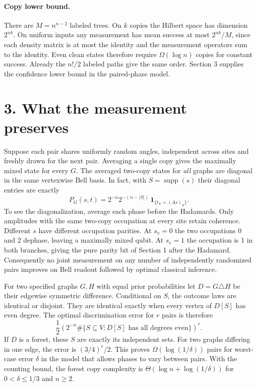 \documentclass[11pt]{article}
\newcommand{\supp}{\operatorname{supp}}
\begin{document}
\paragraph{Copy lower bound.}
There are $M=n^{n-2}$ labeled trees. On $k$ copies the Hilbert space has
dimension $2^{nk}$. On uniform inputs any measurement has mean success
at most $2^{nk}/M$, since each density matrix is at most the identity and
the measurement operators sum to the identity. Even clean states therefore
require $\Omega(\log n)$ copies for constant success. Already the $n!/2$
labeled paths give the same order. Section 3 supplies the confidence
lower bound in the paired-phase model.

\newpage
\section*{3. What the measurement preserves}
Suppose each pair shares uniformly random angles, independent across sites
and freshly drawn for the next pair. Averaging a single copy gives the
maximally mixed state for every $G$. The averaged two-copy states for
\emph{all} graphs are diagonal in the same vertexwise Bell basis.
In fact, with $S=\supp(s)$ their diagonal entries are exactly
\[
 P_G(s,t)=2^{-n}2^{-(n-|S|)}\,\mathbf1_{\{t_S=(As)_S\}} .
\]
To see the diagonalization, average each phase before the Hadamards.
Only amplitudes with the same two-copy occupation at every site retain
coherence. Different $s$ have different occupation parities. At $s_v=0$
the two occupations 0 and 2 dephase, leaving a maximally mixed qubit.
At $s_v=1$ the occupation is 1 in both branches, giving the pure parity
bit of Section 1 after the Hadamard. Consequently no joint measurement
on any number of independently randomized pairs improves on Bell readout
followed by optimal classical inference.

For two specified graphs $G,H$ with equal prior probabilities let
$D=G\triangle H$ be their edgewise symmetric difference. Conditional
on $S$, the outcome laws are identical or disjoint. They are identical
exactly when every vertex of $D[S]$ has even degree. The optimal
discrimination error for $r$ pairs is therefore
\[
 \frac12\left(2^{-n}\#\{S\subseteq V: D[S]\text{ has all degrees even}\}\right)^r.
\]
If $D$ is a forest, these $S$ are exactly its independent sets. For two
graphs differing in one edge, the error is $(3/4)^r/2$. This proves
$\Omega(\log(1/\delta))$ pairs for worst-case error $\delta$ in the model
that allows phases to vary between pairs. With the counting bound, the
forest copy complexity is $\Theta(\log n+\log(1/\delta))$ for
$0<\delta\le1/3$ and $n\ge2$.
\end{document}
